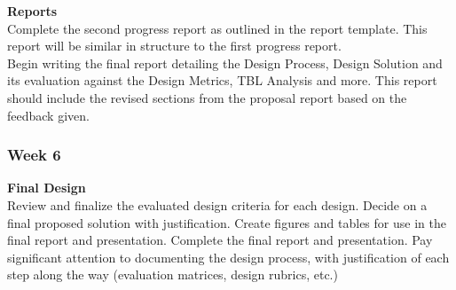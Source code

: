 \documentclass[../CourseManual.tex]{subfiles}
\begin{document}
\textbf{Reports}\\
Complete the second progress report as outlined in the report template. This report will be similar in structure to the first progress report.\\

Begin writing the final report detailing the Design Process, Design Solution and its evaluation against the Design Metrics, TBL Analysis and more. This report should include the revised sections from the proposal report based on the feedback given.

\subsubsection{Week 6} \label{Week 6: Formation}
\textbf{Final Design}\\
Review and finalize the evaluated design criteria for each design. Decide on a final proposed solution with justification. Create figures and tables for use in the final report and presentation. Complete the final report and presentation. Pay significant attention to documenting the design process, with justification of each step along the way (evaluation matrices, design rubrics, etc.)
\end{document}
